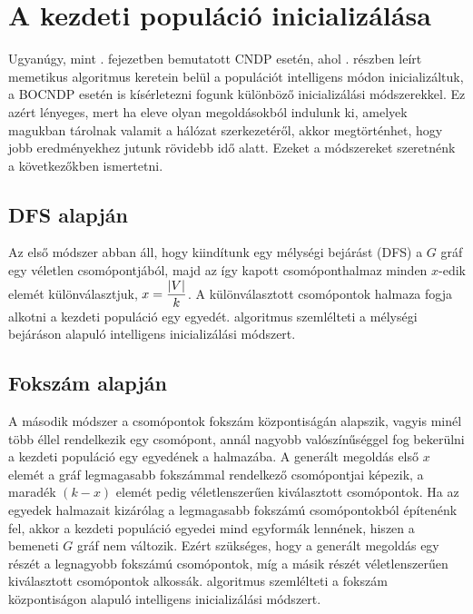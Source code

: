 \section{A kezdeti populáció inicializálása}


Ugyanúgy, mint . fejezetben bemutatott CNDP esetén, ahol . részben leírt memetikus algoritmus keretein belül a populációt intelligens módon inicializáltuk, a BOCNDP esetén is kísérletezni fogunk különböző inicializálási módszerekkel.
Ez azért lényeges, mert ha eleve olyan megoldásokból indulunk ki, amelyek magukban tárolnak valamit a hálózat szerkezetéről, akkor megtörténhet, hogy jobb eredményekhez jutunk rövidebb idő alatt.
Ezeket a módszereket szeretnénk a következőkben ismertetni.


\subsection{DFS alapján}
Az első módszer abban áll, hogy kiindítunk egy mélységi bejárást (DFS) a $G$ gráf egy véletlen csomópontjából,
majd az így kapott csomóponthalmaz minden $x$-edik elemét különválasztjuk, $x = \dfrac{\lvert V\rvert}{k}$.
A különválasztott csomópontok halmaza fogja alkotni a kezdeti populáció egy egyedét.
 algoritmus szemlélteti a mélységi bejáráson alapuló intelligens inicializálási módszert.



\subsection{Fokszám alapján}
A második módszer a csomópontok fokszám központiságán alapszik, vagyis minél több éllel rendelkezik egy csomópont, annál nagyobb valószínűséggel fog bekerülni a kezdeti populáció egy egyedének a halmazába.
A generált megoldás első $x$ elemét a gráf legmagasabb fokszámmal rendelkező csomópontjai képezik, a maradék $(k - x)$ elemét pedig véletlenszerűen kiválasztott csomópontok.
Ha az egyedek halmazait kizárólag a legmagasabb fokszámú csomópontokból építenénk fel, akkor a kezdeti populáció egyedei mind egyformák lennének, hiszen a bemeneti $G$ gráf nem változik.
Ezért szükséges, hogy a generált megoldás egy részét a legnagyobb fokszámú csomópontok, míg a másik részét véletlenszerűen kiválasztott csomópontok alkossák.
 algoritmus szemlélteti a fokszám központiságon alapuló intelligens inicializálási módszert.



